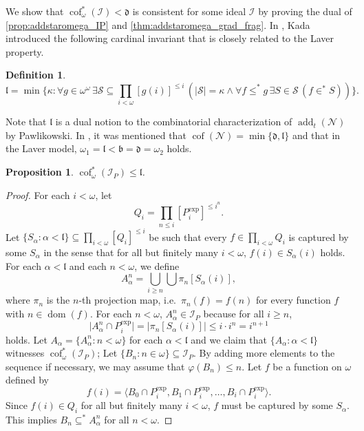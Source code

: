 \documentclass[a4paper,12pt]{amsart}
\newtheorem{prop}[thm]{Proposition}
\theoremstyle{definition}
\newtheorem{dfn}[thm]{Definition}
\numberwithin{thm}{section}
\numberwithin{equation}{section}
\newcommand{\bb}{\mathfrak{b}}
\newcommand{\dd}{\mathfrak{d}}
\DeclareMathOperator{\add}{add}
\DeclareMathOperator{\cof}{cof}
\DeclareMathOperator{\dom}{dom}
\newcommand{\I}{\mathscr{I}}
\renewcommand{\subset}{\subseteq}
\begin{document}
    We show that $\cof^*_\omega(\I) <\dd$ is consistent for some ideal $\I$ by proving the dual of \cref{prop:addstaromega_IP} and \cref{thm:addstaromega_grad_frag}. In \cite{Kad00}, Kada introduced the following cardinal invariant that is closely related to the Laver property.

    \begin{dfn}
        \[
        \mathfrak{l} = \min\{\kappa:\forall g\in\omega^\omega\,\exists\mathcal{S}\subset\prod_{i<\omega}[g(i)]^{\leq i}\,(\lvert\mathcal{S}\rvert = \kappa\land\forall f\leq^* g\,\exists S\in\mathcal{S}\,(f\in^* S))\}.
        \]
    \end{dfn}
    
    Note that $\mathfrak{l}$ is a dual notion to the combinatorial characterization of $\add_t(\mathcal{N})$ by Pawlikowski. In \cite{Kad00}, it was mentioned that $\cof(\mathcal{N}) = \min\{\dd, \mathfrak{l}\}$ and that in the Laver model, $\omega_1 = \mathfrak{l} < \bb = \dd = \omega_2$ holds.
    
    \begin{prop}\label{prop:cofstaromega_IP}
		$\cof^*_\omega(\I_P) \leq \mathfrak{l}$.
	\end{prop}	
	\begin{proof}
        For each $i<\omega$, let
        \[
        Q_i = \prod_{n\leq i} [P_i^\mathrm{exp}]^{\leq i^n}.
        \]
        Let $\{S_\alpha:\alpha<\mathfrak{l}\}\subset\prod_{i<\omega}[Q_i]^{\leq i}$ be such that every $f\in\prod_{i<\omega}Q_i$ is captured by some $S_\alpha$ in the sense that for all but finitely many $i<\omega$, $f(i)\in S_\alpha(i)$ holds. For each $\alpha<\mathfrak{l}$ and each $n<\omega$, we define
        \[
        A_\alpha^n = \bigcup_{i\geq n} \bigcup\pi_n[S_\alpha(i)],
        \]
        where $\pi_n$ is the $n$-th projection map, i.e.\ $\pi_n(f) = f(n)$ for every function $f$ with $n\in\dom(f)$. For each $n<\omega$, $A_\alpha^n \in \I_P$ because for all $i\geq n$,
        \[
        \lvert A_\alpha^n\cap P^{\mathrm{exp}}_i\rvert = \lvert\pi_n[S_\alpha(i)]\rvert \leq i\cdot i^n = i^{n+1}
        \]
        holds. Let $A_\alpha = \{A^n_\alpha:n<\omega\}$ for each $\alpha<\mathfrak{l}$ and we claim that $\{A_\alpha : \alpha<\mathfrak{l}\}$ witnesses $\cof^*_\omega(\I_P)$; Let $\{B_n:n \in \omega\}\subset\I_P$. By adding more elements to the sequence if necessary, we may assume that $\varphi(B_n) \leq n$. Let $f$ be a function on $\omega$ defined by
        \[
        f(i) = \langle B_0 \cap P_i^\mathrm{exp}, B_1 \cap P_i^\mathrm{exp}, \ldots, B_i \cap P_i^\mathrm{exp} \rangle.
        \]
        Since $f(i)\in Q_i$ for all but finitely many $i<\omega$, $f$ must be captured by some $S_\alpha$. This implies $B_n \subset^* A^n_\alpha$ for all $n<\omega$.
	\end{proof}
\end{document}
